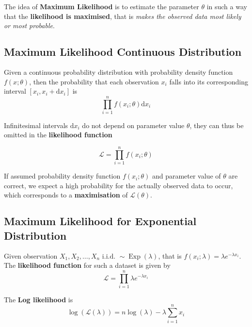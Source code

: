 \documentclass[11pt]{article}
\theoremstyle{definition}
\newcommand*\Likelihood{\mathcal{L}}
\newcommand*\Exp[1]{\mathop{\text{Exp}}\left(#1\right)}
\begin{document}
The idea of \textbf{Maximum Likelihood} is to estimate the parameter $\theta$ in such a way that the \textbf{likelihood is maximised}, that is \emph{makes the observed data most likely or most probable}.

\subsection{Maximum Likelihood Continuous Distribution}
Given a continuous probability distribution  with probability density function $f (x;\theta)$, then the probability that each observation $x_i$ falls into its corresponding interval $[x_i, x_i + \text{d}x_i]$ is
\begin{equation*}
	\prod_{i=1}^{n} f(x_i; \theta) \text{d}x_i
\end{equation*}

Infinitesimal intervals $\text{d}x_i$ do not depend on parameter value $\theta$, they can thus be omitted in the \textbf{likelihood function}

\begin{equation*}
	\Likelihood = \prod_{i=1}^{n} f(x_i;\theta)
\end{equation*}

If assumed probability density function $f (x_i ;\theta)$ and parameter value of $\theta$ are correct, we expect a high probability for the actually observed data to occur, which corresponds to a \textbf{maximisation} of $\Likelihood(\theta)$.

\subsection{Maximum Likelihood for Exponential Distribution}
Given observation $X_1, X_2, \dots, X_n\text{ i.i.d. }\sim \Exp{\lambda}$, that is $f(x_i;\lambda) = \lambda e^{-\lambda x_i}$. The \textbf{likelihood function} for such a  dataset is given by
\begin{equation*}
	\Likelihood = \prod_{i=1}^{n} \lambda e^{-\lambda x_i}
\end{equation*}

The \textbf{Log likelihood} is
\begin{equation*}
	\log(\Likelihood(\lambda)) = n\log(\lambda) - \lambda\sum_{i=1}^n x_i
\end{equation*}
\end{document}
